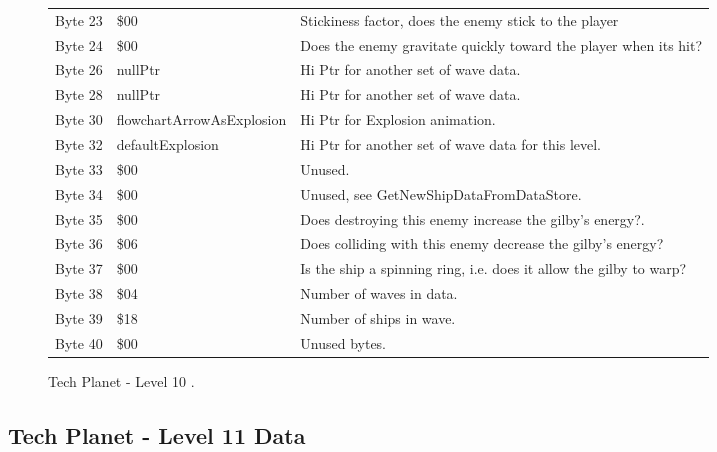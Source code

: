 \begin{figure}[H]
{\begin{adjustbox}{width=12cm}
\begin{tabular}{lll}
 Byte 23 & \$00                       & Stickiness factor, does the enemy stick to the player              \\
 Byte 24 & \$00                       & Does the enemy gravitate quickly toward the player when its hit?   \\
 Byte 26 & nullPtr                   & Hi Ptr for another set of wave data.                               \\
 Byte 28 & nullPtr                   & Hi Ptr for another set of wave data.                               \\
 Byte 30 & flowchartArrowAsExplosion & Hi Ptr for Explosion animation.                                    \\
 Byte 32 & defaultExplosion          & Hi Ptr for another set of wave data for this level.                \\
 Byte 33 & \$00                       & Unused.                                                            \\
 Byte 34 & \$00                       & Unused, see GetNewShipDataFromDataStore.                           \\
 Byte 35 & \$00                       & Does destroying this enemy increase the gilby's energy?.           \\
 Byte 36 & \$06                       & Does colliding with this enemy decrease the gilby's energy?        \\
 Byte 37 & \$00                       & Is the ship a spinning ring, i.e. does it allow the gilby to warp? \\
 Byte 38 & \$04                       & Number of waves in data.                                           \\
 Byte 39 & \$18                       & Number of ships in wave.                                           \\
 Byte 40 & \$00                       & Unused bytes.                                                      \\
\bottomrule
\end{tabular}

  \end{adjustbox}

  }\caption*{Tech Planet - Level 10
.}
\end{figure}

\clearpage
\subsection{Tech Planet - Level 11 Data}

